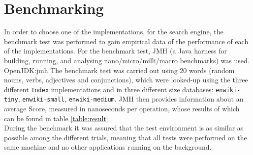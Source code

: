 \section{Benchmarking}
In order to choose one of the implementations, for the search engine, the benchmark test was performed to gain empirical data of the performance of each of the implementations. For the benchmark test, JMH (a Java harness for building, running, and analysing nano/micro/milli/macro benchmarks) was used. {OpenJDK:jmh} The benchmark test was carried out using 20 words (random nouns, verbs, adjectives and conjunctions), which were looked-up using the three different {\tt Index} implementations and in three different size databases: {\tt enwiki-tiny}, {\tt enwiki-small}, {\tt enwiki-medium}. JMH then provides information about an average Score, measured in nanoseconds per operation, whose results of which can be found in table \ref{table:result}\\
During the benchmark it was assured that the test environment is as similar as possible among the different trials, meaning that all tests were performed on the same machine and no other applications running on the background.

